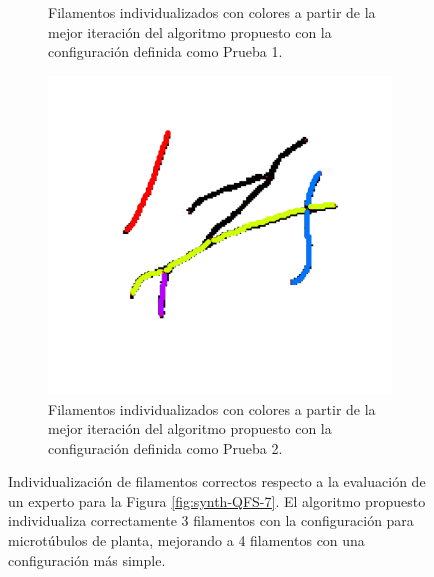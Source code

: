 \begin{figure}[h!]
\begin{subfigure}[t]{0.47\textwidth}
        \caption{Filamentos individualizados con colores a partir de la mejor iteraci\'on del algoritmo propuesto con la configuraci\'on definida como Prueba 1.}
        \label{fig:SynthQFS7-Individualizacion-BestP1}
    \end{subfigure}
    \hspace{0.2cm}
    \begin{subfigure}[t]{0.47\textwidth}
        \centering
        \includegraphics[scale=0.13]{resultImages/Synth-QuantitativeIFS-Fig7-phil-s1271-v056-exactMatch-antLabeled.png}
        \caption{Filamentos individualizados con colores a partir de la mejor iteraci\'on del algoritmo propuesto con la configuraci\'on definida como Prueba 2.}
        \label{fig:SynthQFS7-Individualizacion-BestP2}
    \end{subfigure}
        
    \caption{Individualizaci\'on de filamentos correctos respecto a la evaluaci\'on de un experto para la Figura \ref{fig:synth-QFS-7}. El algoritmo propuesto individualiza correctamente 3 filamentos con la configuraci\'on para microt\'ubulos de planta, mejorando a 4 filamentos con una configuraci\'on m\'as simple.}
    \label{fig:Synth-QIFS-Result}
\end{figure}




